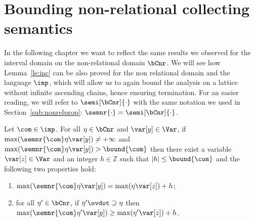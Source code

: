 \section{Bounding non-relational collecting semantics}\label{sec:boundingnonrel}

In the following chapter we want to reflect the same results we
observed for the interval domain on the non-relational domain
\(\bCnr\). We will see how Lemma~\ref{le:inc} can be also proved for
the non relational domain and the language \(\imp\), which will allow
us to again bound the analysis on a lattice without infinite ascending
chains, hence ensuring termination.  For an easier reading, we will
refer to \(\semi[\bCnr]{\cdot}\) with the same notation we used in
Section~\ref{sub:nonrelprop}: \(\semnr{\cdot} = \semi[\bCnr]{\cdot}\).

\begin{lemma}\label{le:incnr}
  Let \(\com\in \imp\).
  For all \(\eta \in \bCnr\) and \(\var[y] \in \Var\), if
  \(\max(\semnr{\com} \eta \var[y]) \neq +\infty\) and
  \(\max(\semnr{\com}\eta \var[y]) > \bound{\com}\) then there exist a
  variable \(\var[z] \in \Var\) and an integer \(h \in \mathbb{Z}\)
  such that \(|h| \leq \bound{\com}\) and the following two properties
  hold:
  \begin{enumerate}[label=(\roman*)]
  \item\label{point1nrdef}
    \(\max(\semnr{\com}\eta \var[y]) = \max(\eta \var[z]) + h\);
  \item\label{point2nrdef} for all \(\eta' \in \bCnr\), if
    \(\eta' \ovdot\supseteq \eta\)
    then
    \(\max(\semnr{\com}\eta' \var[y]) \geq \max(\eta' \var[z]) + h\).
  \end{enumerate}
\end{lemma}

